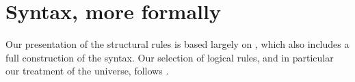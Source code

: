 \section{Syntax, more formally}

\bgroup %

\newcommand{\oftype}{\mathord{:}}
\newcommand{\types}{\vdash}
\newcommand{\myType}{\textsf{type}} %
\newcommand{\cxt}{\textsf{cxt}}
\newcommand{\emptycxt}{[\ ]}
\newcommand{\form}{\textsc{form}}
\newcommand{\intro}{\textsc{intro}}
\newcommand{\appRule}{\textsc{app}}
\newcommand{\elim}{\textsc{elim}}
\newcommand{\comp}{\textsc{comp}}
\newcommand{\Weak}{\mathsf{Wkg}}
\newcommand{\Vble}{\mathsf{Vble}}
\newcommand{\Exch}{\mathsf{Exch}}
\newcommand{\Subst}{\mathsf{Subst}}
\newcommand{\synId}{\mathsf{Id}}
\newcommand{\synPi}{\mathsf{\Pi}}
\newcommand{\synSigma}{\mathsf{\Sigma}}
\newcommand{\synW}{\mathsf{W}}
\newcommand{\synOne}{\mathsf{1}}
\newcommand{\synZero}{\mathsf{0}}
\newcommand{\synPlus}{+}
\newcommand{\synU}{\mathsf{U}}
\newcommand{\el}{\mathsf{El}}
\newcommand{\synrefl}{\mathsf{refl}}
\newcommand{\synlambda}{\mathsf{\lambda}}
\newcommand{\myRefl}{\mathsf{refl}} %
\newcommand{\synsup}{\mathsf{sup}}
\newcommand{\synz}{\mathsf{z}}
\newcommand{\syno}{\mathsf{o}}
\newcommand{\synw}{\mathsf{w}}
\newcommand{\synpi}{\boldsymbol{\pi}}
\newcommand{\synsigma}{\boldsymbol{\sigma}}
\newcommand{\synid}{\mathsf{id}}

\let\syn\mathsf
\newcommand{\synisHIso}{\mathsf{isHIso}}
\newcommand{\synHIso}{\mathsf{HIso}}
\newcommand{\synisEquiv}{\mathsf{isEquiv}}
\newcommand{\synEquiv}{\mathsf{Equiv}}
\newcommand{\synisAdjEquiv}{\mathsf{isAdjEquiv}}
\newcommand{\synAdjEquiv}{\mathsf{AdjEquiv}}
\newcommand{\synHEquivStrux}{\mathsf{HEquivStrux}}
\newcommand{\synHEquiv}{\mathsf{HEquiv}}
\newcommand{\synHFib}{\mathsf{hFib}}
\newcommand{\synHomLHInv}{\mathsf{HomLInv}}
\newcommand{\synHomRHInv}{\mathsf{HomRInv}}
\newcommand{\synLHInv}{\mathsf{LInv}}
\newcommand{\synRHInv}{\mathsf{RInv}}
\newcommand{\synisUnivalent}{\mathsf{isUnivalent}}
\newcommand{\synisContr}{\mathsf{isContr}}
\newcommand{\synisWEq}{\mathsf{isWEq}}
\newcommand{\synWEq}{\mathsf{WEq}}

Our presentation of the structural rules is based largely on
\cite{hofmann:syntax-and-semantics}, which also includes a full construction of
the syntax.  Our selection of logical rules, and in particular our treatment of
the universe, follows \cite{martin-lof:bibliopolis}.

